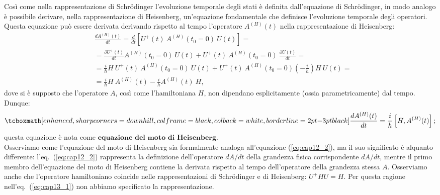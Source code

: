 \documentclass[a4paper,12pt,oneside]{book}
\begin{document}
Così come nella rappresentazione di Schrödinger l'evoluzione temporale degli stati è definita dall'equazione di Schrödinger, in modo analogo è possibile derivare, nella rappresentazione di Heisenberg, un'equazione fondamentale che definisce l'evoluzione temporale degli operatori. Questa equazione può essere derivata derivando rispetto al tempo l'operatore $A^{(H)}(t)$ nella rappresentazione di Heisenberg:
	\begin{align}
		& \frac{dA^{(H)}(t)}{dt} = \frac{d}{dt}\left[U^\textbf{+}(t)\  A^{(H)}(t_0=0)\ U(t)\right] = \nonumber \\
		&= \frac{\partial U^\textbf{+}(t)}{dt} A^{(H)}(t_0=0)\ U(t) + U^\textbf{+}(t)\  A^{(H)}(t_0=0)\ \frac{\partial U(t)}{dt} = \nonumber \\
		&= \frac{i}{\hbar} H\ U^\textbf{+}(t)\ A^{(H)}(t_0=0)\ U(t) + U^\textbf{+}(t)\ A^{(H)}(t_0=0) \left(-\frac{i}{h}\right) H\ U(t) = \nonumber \\
		&= \frac{i}{\hbar} H\ A^{(H)}(t) - \frac{i}{h} A^{(H)}(t)\ H,
	\end{align}
dove si è supposto che l'operatore $A$, così come l'hamiltoniana $H$, non dipendano esplicitamente (ossia parametricamente) dal tempo. Dunque:
	\begin{equation}
	\label{eq:cap13_1}
		\tcboxmath[enhanced, sharp corners=downhill, colframe=black, colback=white, borderline={2pt}{-3pt}{black}]{
			\frac{d A^{(H)}(t)}{dt} = \frac{i}{h} \left[H, A^{(H)}(t) \right];
			}
	\end{equation}
questa equazione è nota come $\textbf{equazione del moto di Heisenberg}$.\\
 
Osserviamo come l'equazione del moto di Heisenberg sia formalmente analoga all'equazione (\ref{eq:cap12_2}), ma il suo significato è alquanto differente: l'eq.~(\ref{eq:cap12_2}) rappresenta la definizione dell'operatore $dA/dt$ della grandezza fisica corrispondente $dA/dt$, mentre il primo membro dell'equazione del moto di Heisenberg contiene la derivata rispetto al tempo dell'operatore della grandezza stessa $A$. Osserviamo anche che l'operatore hamiltoniano coincide nelle rappresentazioni di Schrödinger e di Heisenberg: $U^\textbf{+} H U = H$. Per questa ragione nell'eq.~(\ref{eq:cap13_1}) non abbiamo specificato la rappresentazione.
\end{document}
